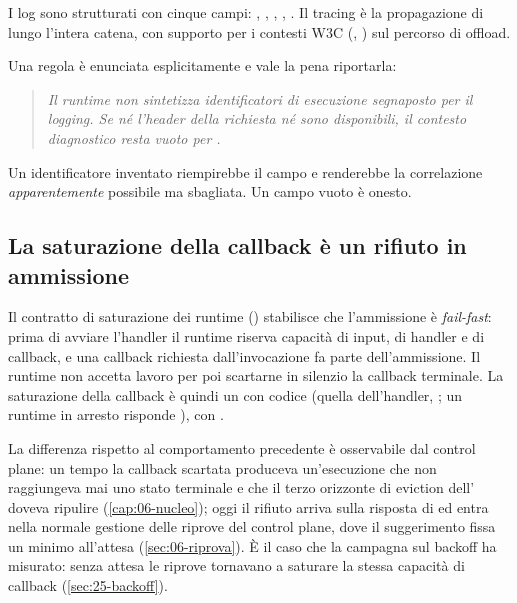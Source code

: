 I log sono strutturati con cinque campi: ,
, , , . Il tracing
\`e la propagazione di  lungo l'intera catena, con supporto per
i contesti W3C (, ) sul percorso di offload.

Una regola \`e enunciata esplicitamente e vale la pena riportarla:

\begin{quote}\itshape
Il runtime non sintetizza identificatori di esecuzione segnaposto per il
logging. Se n\'e l'header della richiesta n\'e  sono
disponibili, il contesto diagnostico resta vuoto per .
\end{quote}

Un identificatore inventato riempirebbe il campo e renderebbe la correlazione
\emph{apparentemente} possibile ma sbagliata. Un campo vuoto \`e onesto.

\subsection{La saturazione della callback \`e un rifiuto in ammissione}

Il contratto di saturazione dei runtime ()
stabilisce che l'ammissione \`e \emph{fail-fast}: prima di avviare l'handler il
runtime riserva capacit\`a di input, di handler e di callback, e una callback
richiesta dall'invocazione fa parte dell'ammissione. Il runtime non accetta
lavoro per poi scartarne in silenzio la callback terminale. La saturazione della
callback \`e quindi un  con codice 
(quella dell'handler, ; un runtime in arresto
risponde ), con .

La differenza rispetto al comportamento precedente \`e osservabile dal control
plane: un tempo la callback scartata produceva un'esecuzione che non raggiungeva
mai uno stato terminale e che il terzo orizzonte di eviction dell'
doveva ripulire (\cref{cap:06-nucleo}); oggi il rifiuto arriva sulla risposta di
 ed entra nella normale gestione delle riprove del control plane,
dove il suggerimento  fissa un minimo all'attesa
(\cref{sec:06-riprova}). \`E il caso che la campagna sul backoff ha misurato:
senza attesa le riprove tornavano a saturare la stessa capacit\`a di callback
(\cref{sec:25-backoff}).

